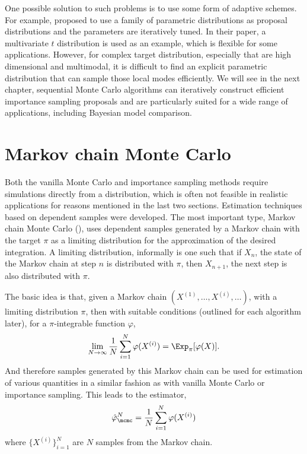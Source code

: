 One possible solution to such problems is to use some form of adaptive
schemes. For example, \cite{ManSuk:1992vx} proposed to use a family of
parametric distributions as proposal distributions and the parameters are
iteratively tuned. In their paper, a multivariate $t$ distribution is used as
an example, which is flexible for some applications. However, for complex
target distribution, especially that are high dimensional and multimodal, it
is difficult to find an explicit parametric distribution that can sample those
local modes efficiently. We will see in the next chapter, sequential Monte
Carlo algorithms can iteratively construct efficient importance sampling
proposals and are particularly suited for a wide range of applications,
including Bayesian model comparison.

\section{Markov chain Monte Carlo}
\label{sec:Markov chain Monte Carlo}

Both the vanilla Monte Carlo and importance sampling methods require
simulations directly from a distribution, which is often not feasible in
realistic applications for reasons mentioned in the last two sections.
Estimation techniques based on dependent samples were developed. The most
important type, Markov chain Monte Carlo (\mcmc), uses dependent samples
generated by a Markov chain with the target $\pi$ as a limiting distribution
for the approximation of the desired integration. A limiting distribution,
informally is one such that if $X_n$, the state of the Markov chain at step
$n$ is distributed with $\pi$, then $X_{n+1}$, the next step is also
distributed with $\pi$.

The basic idea is that, given a Markov chain $(X^{(1)},\dots,X^{(i)},\dots)$,
with a limiting distribution $\pi$, then with suitable conditions (outlined
for each algorithm later), for a $\pi$-integrable function $\varphi$,
\begin{equation}
  \lim_{N\to\infty}\frac{1}{N}\sum_{i=1}^N\varphi(X^{(i)}) =
  \Exp_{\pi}[\varphi(X)].
  \label{eq:mcmc convergence}
\end{equation}
And therefore samples generated by this Markov chain can be used for
estimation of various quantities in a similar fashion as with vanilla Monte
Carlo or importance sampling. This leads to the estimator,
\begin{equation}
  \hat\varphi_{\mcmc}^N = \frac{1}{N}\sum_{i=1}^N\varphi(X^{(i)})
  \label{eq:mcmc est}
\end{equation}
where $\{X^{(i)}\}_{i=1}^N$ are $N$ samples from the Markov chain.

